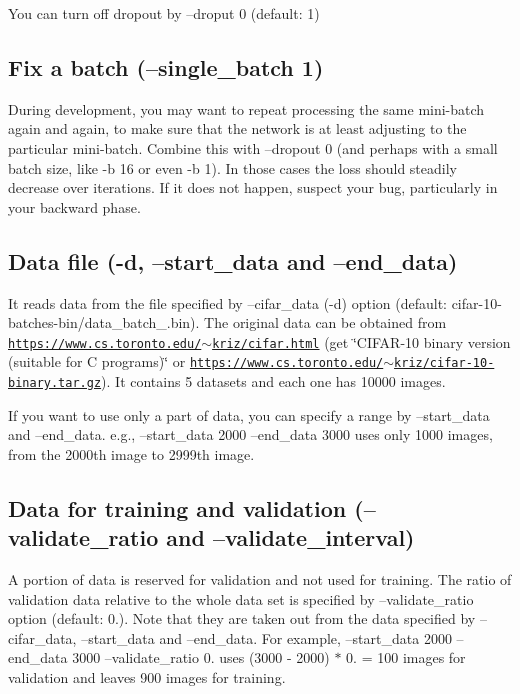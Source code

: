 You can turn off dropout by --droput 0 (default\+: 1)

\subsection*{Fix a batch (--single\+\_\+batch 1) }

During development, you may want to repeat processing the same mini-\/batch again and again, to make sure that the network is at least adjusting to the particular mini-\/batch. Combine this with --dropout 0 (and perhaps with a small batch size, like -\/b 16 or even -\/b 1). In those cases the loss should steadily decrease over iterations. If it does not happen, suspect your bug, particularly in your backward phase.

\subsection*{Data file (-\/d, --start\+\_\+data and --end\+\_\+data) }

It reads data from the file specified by --cifar\+\_\+data (-\/d) option (default\+: cifar-\/10-\/batches-\/bin/data\+\_\+batch\+\_.\+bin). The original data can be obtained from \href{https://www.cs.toronto.edu/~kriz/cifar.html}{\tt https\+://www.\+cs.\+toronto.\+edu/$\sim$kriz/cifar.\+html} (get \char`\"{}\+C\+I\+F\+A\+R-\/10 binary version (suitable for C programs)\char`\"{} or \href{https://www.cs.toronto.edu/~kriz/cifar-10-binary.tar.gz}{\tt https\+://www.\+cs.\+toronto.\+edu/$\sim$kriz/cifar-\/10-\/binary.\+tar.\+gz}). It contains 5 datasets and each one has 10000 images.

If you want to use only a part of data, you can specify a range by --start\+\_\+data and --end\+\_\+data. e.\+g., --start\+\_\+data 2000 --end\+\_\+data 3000 uses only 1000 images, from the 2000th image to 2999th image.

\subsection*{Data for training and validation (--validate\+\_\+ratio and --validate\+\_\+interval) }

A portion of data is reserved for validation and not used for training. The ratio of validation data relative to the whole data set is specified by --validate\+\_\+ratio option (default\+: 0.). Note that they are taken out from the data specified by --cifar\+\_\+data, --start\+\_\+data and --end\+\_\+data. For example, --start\+\_\+data 2000 --end\+\_\+data 3000 --validate\+\_\+ratio 0. uses (3000 -\/ 2000) $\ast$ 0. = 100 images for validation and leaves 900 images for training.

